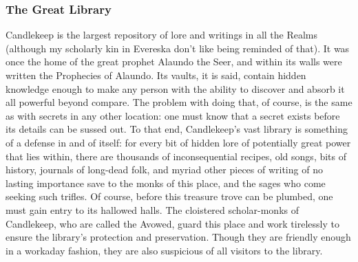 \documentclass[10pt,a4paper,twoside,twocolumn,openany,bg=print,nodeprecatedcode]{dndbook}
\begin{document}
\subsubsection{The Great Library}
Candlekeep is the largest repository of lore and writings in all the Realms (although my scholarly kin in Evereska don't like being reminded of that). It was once the home of the great prophet Alaundo the Seer, and within its walls were written the Prophecies of Alaundo. Its vaults, it is said, contain hidden knowledge enough to make any person with the ability to discover and absorb it all powerful beyond compare. The problem with doing that, of course, is the same as with secrets in any other location: one must know that a secret exists before its details can be sussed out.
To that end, Candlekeep's vast library is something of a defense in and of itself: for every bit of hidden lore of potentially great power that lies within, there are thousands of inconsequential recipes, old songs, bits of history, journals of long-dead folk, and myriad other pieces of writing of no lasting importance save to the monks of this place, and the sages who come seeking such trifles.
Of course, before this treasure trove can be plumbed, one must gain entry to its hallowed halls. The cloistered scholar-monks of Candlekeep, who are called the Avowed, guard this place and work tirelessly to ensure the library's protection and preservation. Though they are friendly enough in a workaday fashion, they are also suspicious of all visitors to the library.
\end{document}
